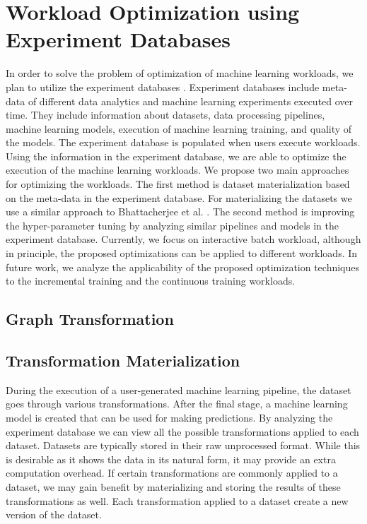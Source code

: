 \documentclass{sig-alternate-05-2015}
\begin{document}
\section{Workload Optimization using Experiment Databases}\label{workload-optimization}
In order to solve the problem of optimization of machine learning workloads, we plan to utilize the experiment databases \cite{schelterautomatically}.
Experiment databases include meta-data of different data analytics and machine learning experiments executed over time.
They include information about datasets, data processing pipelines, machine learning models, execution of machine learning training, and quality of the models.
The experiment database is populated when users execute workloads.
Using the information in the experiment database, we are able to optimize the execution of the machine learning workloads.
We propose two main approaches for optimizing the workloads. 
The first method is dataset materialization based on the meta-data in the experiment database.
For materializing the datasets we use a similar approach to Bhattacherjee et al. \cite{bhattacherjee2015principles}.
The second method is improving the hyper-parameter tuning by analyzing similar pipelines and models in the experiment database.
Currently, we focus on interactive batch workload, although in principle, the proposed optimizations can be applied to different workloads.
In future work, we analyze the applicability of the proposed optimization techniques to the incremental training and the continuous training workloads.

\subsection{Graph Transformation}
\subsection{Transformation Materialization}
During the execution of a user-generated machine learning pipeline, the dataset goes through various transformations.
After the final stage, a machine learning model is created that can be used for making predictions.
By analyzing the experiment database we can view all the possible transformations applied to each dataset.
Datasets are typically stored in their raw unprocessed format.
While this is desirable as it shows the data in its natural form, it may provide an extra computation overhead.
If certain transformations are commonly applied to a dataset, we may gain benefit by materializing and storing the results of these transformations as well.
Each transformation applied to a dataset create a new version of the dataset.
\end{document}
